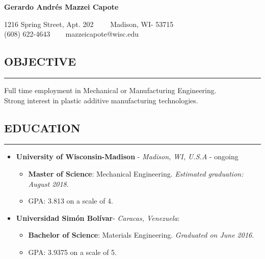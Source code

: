 \documentclass[11pt,letterpaper]{article}
\newenvironment{indentsection}[1]%
{\begin{list}{}%
	{\setlength{\leftmargin}{#1}}%
	\item[]%
}
{\end{list}}
\begin{document}
	\thispagestyle{firststyle}
	
\begin{center}
	{\LARGE \textbf{Gerardo Andrés Mazzei Capote}}

	1216 Spring Street, Apt. 202\ \ \textbullet
	\ \ Madison, WI- 53715
	\\
	(608) 622-4643 \ \textbullet
	\ \ mazzeicapote@wisc.edu
\end{center}

\vspace{-1em}

\subsection*{OBJECTIVE}
	\vspace{-0.5em}
	\hrule
	\vspace{0.4em}
	\begin{indentsection}{\parindent}
		Full time employment in Mechanical or Manufacturing Engineering.\\
		Strong interest in plastic additive manufacturing technologies.
	\end{indentsection}


\subsection*{EDUCATION}
	\vspace{-0.5em}
	\hrule
	\vspace{0.4em}
	\begin{itemize}
	\item
	\textbf{University of Wisconsin-Madison} - \emph{Madison, WI, U.S.A} - ongoing
	\begin{itemize}	
	\item
	\textbf{Master of Science}: Mechanical Engineering. \emph{Estimated graduation: August 2018}.
	\item
	GPA: 3.813 on a scale of 4.
\end{itemize}

	\item
	\textbf{Universidad Simón Bolívar}- \emph{Caracas, Venezuela}:
	\begin{itemize}	
		\item
		\textbf{Bachelor of Science}: Materials Engineering. \emph{Graduated on June 2016}.
		\item
		GPA: 3.9375 on a scale of 5.
	\end{itemize}
	\end{itemize}
\end{document}
